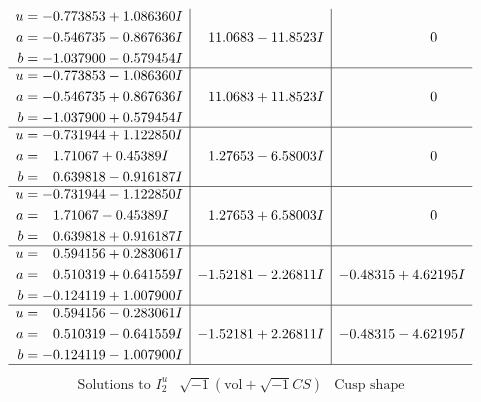 \documentclass[1p]{elsarticle_modified}
\theoremstyle{definition}
\newcommand{\I}{\sqrt{-1}}
\begin{document}
$$\begin{array}{c|c|c}
\begin{aligned}
u &= -0.773853 + 1.086360 I \\
a &= -0.546735 - 0.867636 I \\
b &= -1.037900 - 0.579454 I\end{aligned}
 & \phantom{-}11.0683 - 11.8523 I & \phantom{-0.000000 } 0 \\ \hline\begin{aligned}
u &= -0.773853 - 1.086360 I \\
a &= -0.546735 + 0.867636 I \\
b &= -1.037900 + 0.579454 I\end{aligned}
 & \phantom{-}11.0683 + 11.8523 I & \phantom{-0.000000 } 0 \\ \hline\begin{aligned}
u &= -0.731944 + 1.122850 I \\
a &= \phantom{-}1.71067 + 0.45389 I \\
b &= \phantom{-}0.639818 - 0.916187 I\end{aligned}
 & \phantom{-}1.27653 - 6.58003 I & \phantom{-0.000000 } 0 \\ \hline\begin{aligned}
u &= -0.731944 - 1.122850 I \\
a &= \phantom{-}1.71067 - 0.45389 I \\
b &= \phantom{-}0.639818 + 0.916187 I\end{aligned}
 & \phantom{-}1.27653 + 6.58003 I & \phantom{-0.000000 } 0 \\ \hline\begin{aligned}
u &= \phantom{-}0.594156 + 0.283061 I \\
a &= \phantom{-}0.510319 + 0.641559 I \\
b &= -0.124119 + 1.007900 I\end{aligned}
 & -1.52181 - 2.26811 I & -0.48315 + 4.62195 I \\ \hline\begin{aligned}
u &= \phantom{-}0.594156 - 0.283061 I \\
a &= \phantom{-}0.510319 - 0.641559 I \\
b &= -0.124119 - 1.007900 I\end{aligned}
 & -1.52181 + 2.26811 I & -0.48315 - 4.62195 I\\
 \hline 
 \end{array}$$\newpage$$\begin{array}{c|c|c}  
\text{Solutions to }I^u_{2}& \I (\text{vol} + \sqrt{-1}CS) & \text{Cusp shape}\\
 \hline 
\begin{aligned}

\end{aligned}
\end{array}$$
\end{document}
